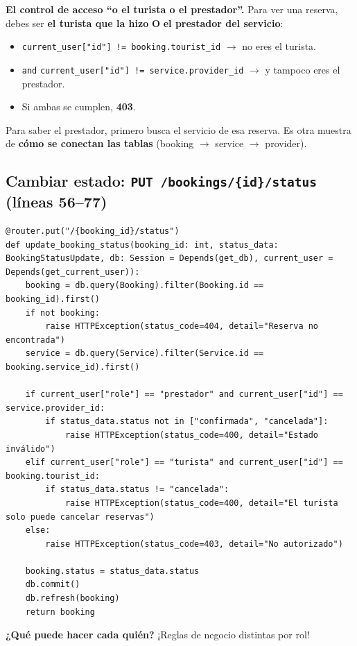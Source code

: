 \documentclass[11pt,a4paper]{article}
\begin{document}
\textbf{El control de acceso ``o el turista o el prestador''.} Para ver una reserva, debes ser
\textbf{el turista que la hizo} \textbf{O} \textbf{el prestador del servicio}:
\begin{itemize}
    \item \texttt{current\_user["id"] != booking.tourist\_id} $\rightarrow$ no eres el turista.
    \item \texttt{and} \texttt{current\_user["id"] != service.provider\_id} $\rightarrow$ y tampoco eres el prestador.
    \item Si ambas se cumplen, \textbf{403}.
\end{itemize}

Para saber el prestador, primero busca el servicio de esa reserva. Es otra muestra de
\textbf{cómo se conectan las tablas} (booking $\rightarrow$ service $\rightarrow$ provider).

\subsection{Cambiar estado: \texttt{PUT /bookings/\{id\}/status} (líneas 56--77)}

\begin{lstlisting}
@router.put("/{booking_id}/status")
def update_booking_status(booking_id: int, status_data: BookingStatusUpdate, db: Session = Depends(get_db), current_user = Depends(get_current_user)):
    booking = db.query(Booking).filter(Booking.id == booking_id).first()
    if not booking:
        raise HTTPException(status_code=404, detail="Reserva no encontrada")
    service = db.query(Service).filter(Service.id == booking.service_id).first()

    if current_user["role"] == "prestador" and current_user["id"] == service.provider_id:
        if status_data.status not in ["confirmada", "cancelada"]:
            raise HTTPException(status_code=400, detail="Estado inválido")
    elif current_user["role"] == "turista" and current_user["id"] == booking.tourist_id:
        if status_data.status != "cancelada":
            raise HTTPException(status_code=400, detail="El turista solo puede cancelar reservas")
    else:
        raise HTTPException(status_code=403, detail="No autorizado")

    booking.status = status_data.status
    db.commit()
    db.refresh(booking)
    return booking
\end{lstlisting}

\textbf{¿Qué puede hacer cada quién?} ¡Reglas de negocio distintas por rol!
\end{document}
